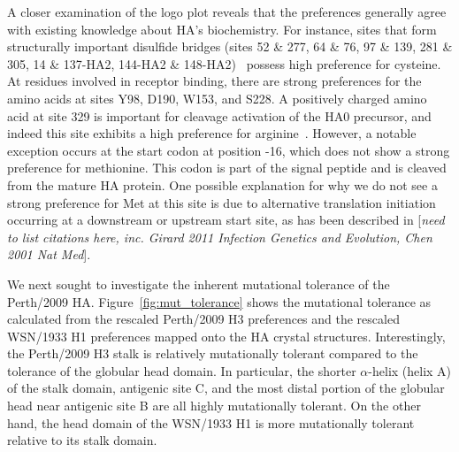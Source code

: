 \documentclass[11pt]{article}
\newcommand{\comment}[1]{{\color{red}[\textsl{#1}]}}
\begin{document}
A closer examination of the logo plot reveals that the preferences generally agree with existing knowledge about HA's biochemistry.
For instance, sites that form structurally important disulfide bridges (sites 52 \& 277, 64 \& 76, 97 \& 139, 281 \& 305, 14 \& 137-HA2, 144-HA2 \& 148-HA2)~\citep{waterfield1981disulphide} possess high preference for cysteine.
At residues involved in receptor binding, there are strong preferences for the amino acids at sites Y98, D190, W153, and S228.
A positively charged amino acid at site 329 is important for cleavage activation of the HA0 precursor, and indeed this site exhibits a high preference for arginine~\citep{kido1992isolation, stech2005new}.
However, a notable exception occurs at the start codon at position -16, which does not show a strong preference for methionine. 
This codon is part of the signal peptide and is cleaved from the mature HA protein.
One possible explanation for why we do not see a strong preference for Met at this site is due to alternative translation initiation occurring at a downstream or upstream start site, as has been described in \comment{need to list citations here, inc. Girard 2011 Infection Genetics and Evolution, Chen 2001 Nat Med}.

We next sought to investigate the inherent mutational tolerance of the Perth/2009 HA. 
Figure~\ref{fig:mut_tolerance} shows the mutational tolerance as calculated from the rescaled Perth/2009 H3 preferences and the rescaled WSN/1933 H1 preferences mapped onto the HA crystal structures.
Interestingly, the Perth/2009 H3 stalk is relatively mutationally tolerant compared to the tolerance of the globular head domain. 
In particular, the shorter $\alpha$-helix (helix A) of the stalk domain, antigenic site C, and the most distal portion of the globular head near antigenic site B are all highly mutationally tolerant.
On the other hand, the head domain of the WSN/1933 H1 is more mutationally tolerant relative to its stalk domain.
\end{document}
